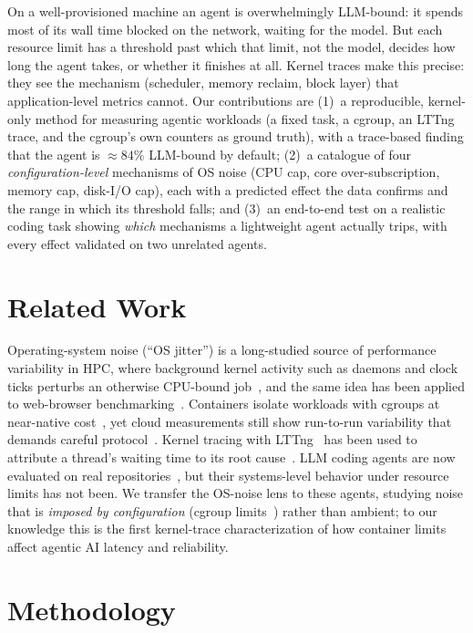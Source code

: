 \documentclass[10pt,conference]{IEEEtran}
\begin{document}
On a well-provisioned machine an agent is overwhelmingly LLM-bound: it
spends most of its wall time blocked on the network, waiting for the model.
But each resource limit has a threshold past which that limit, not the
model, decides how long the agent takes, or whether it finishes at all.
Kernel traces make this precise: they see the mechanism (scheduler, memory
reclaim, block layer) that application-level metrics cannot. Our
contributions are (1)~a reproducible, kernel-only method for measuring
agentic workloads (a fixed task, a cgroup, an LTTng~\cite{desnoyers2006}
trace, and the cgroup's own counters as ground truth), with a trace-based
finding that the agent is ${\approx}84\%$ LLM-bound by default; (2)~a
catalogue of four \emph{configuration-level} mechanisms of OS noise (CPU
cap, core over-subscription, memory cap, disk-I/O cap), each with a
predicted effect the data confirms and the range in which its threshold
falls; and (3)~an end-to-end test on a realistic coding task showing
\emph{which} mechanisms a lightweight agent actually trips, with every
effect validated on two unrelated agents.

\section{Related Work}

Operating-system noise (``OS jitter'') is a long-studied source of
performance variability in HPC, where background kernel activity such as
daemons and clock ticks perturbs an otherwise CPU-bound
job~\cite{petrini2003,tsafrir2005,ferreira2008,hoefler2010}, and the same
idea has been applied to web-browser benchmarking~\cite{larres2013}. Containers isolate workloads with cgroups at near-native
cost~\cite{felter2015}, yet cloud measurements still show run-to-run
variability that demands careful protocol~\cite{maricq2018,mytkowicz2009,hoefler2015}. Kernel tracing with
LTTng~\cite{desnoyers2006} has been used to attribute a thread's waiting
time to its root cause~\cite{giraldeau2016,ezzati2018}. LLM coding agents are now evaluated on real
repositories~\cite{jimenez2024,yang2024}, but their systems-level behavior
under resource limits has not been. We transfer the OS-noise lens to these agents, studying noise that is
\emph{imposed by configuration} (cgroup limits~\cite{cgroupv2}) rather
than ambient; to our knowledge this is the first kernel-trace
characterization of how container limits affect agentic AI latency and
reliability.

\section{Methodology}
\label{sec:method}
\end{document}
